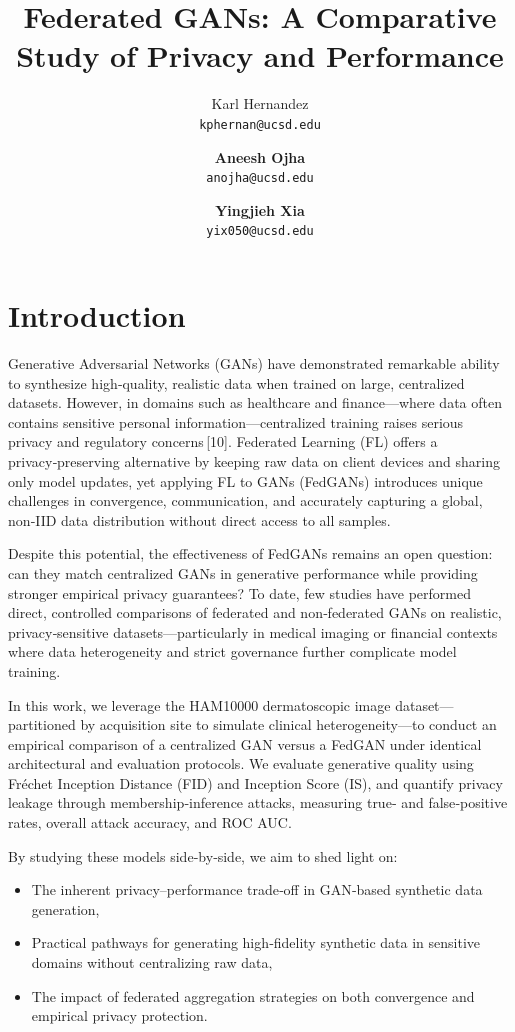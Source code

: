 \documentclass{article}
\title{Federated GANs: A Comparative Study of Privacy and Performance}
\author{%
  Karl Hernandez\\
  \texttt{kphernan@ucsd.edu}\\
  \and
  \textbf{Aneesh Ojha}\\
  \texttt{anojha@ucsd.edu}\\
  \and
  \textbf{Yingjieh Xia}\\
  \texttt{yix050@ucsd.edu}\\
}
\begin{document}
\maketitle
\vspace{-2em}

\section{Introduction}
Generative Adversarial Networks (GANs) have demonstrated remarkable ability to synthesize high‑quality, realistic data when trained on large, centralized datasets. However, in domains such as healthcare and finance—where data often contains sensitive personal information—centralized training raises serious privacy and regulatory concerns\,[10]. Federated Learning (FL) offers a privacy‑preserving alternative by keeping raw data on client devices and sharing only model updates, yet applying FL to GANs (FedGANs) introduces unique challenges in convergence, communication, and accurately capturing a global, non‑IID data distribution without direct access to all samples.  

Despite this potential, the effectiveness of FedGANs remains an open question: can they match centralized GANs in generative performance while providing stronger empirical privacy guarantees? To date, few studies have performed direct, controlled comparisons of federated and non‑federated GANs on realistic, privacy‑sensitive datasets—particularly in medical imaging or financial contexts where data heterogeneity and strict governance further complicate model training.  

In this work, we leverage the HAM10000 dermatoscopic image dataset—partitioned by acquisition site to simulate clinical heterogeneity—to conduct an empirical comparison of a centralized GAN versus a FedGAN under identical architectural and evaluation protocols. We evaluate generative quality using Fréchet Inception Distance (FID) and Inception Score (IS), and quantify privacy leakage through membership‑inference attacks, measuring true‑ and false‑positive rates, overall attack accuracy, and ROC AUC.  

By studying these models side‑by‑side, we aim to shed light on:
\begin{itemize}[itemsep=0.5ex, topsep=0.5ex]
  \item The inherent privacy–performance trade‑off in GAN‑based synthetic data generation,
  \item Practical pathways for generating high‑fidelity synthetic data in sensitive domains without centralizing raw data,
  \item The impact of federated aggregation strategies on both convergence and empirical privacy protection.
\end{itemize}
\end{document}
